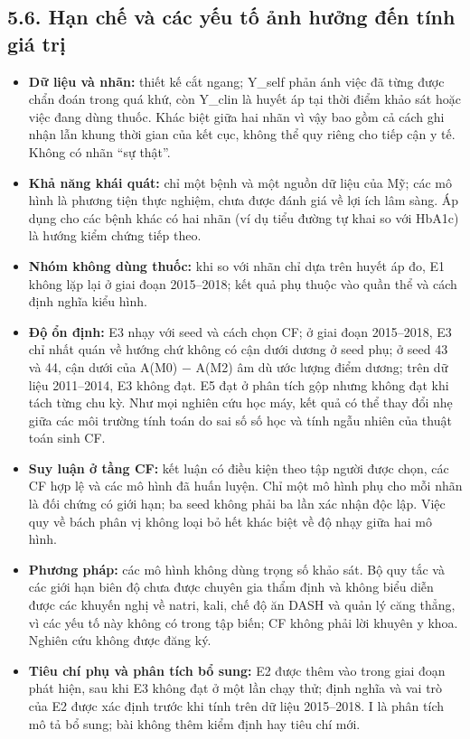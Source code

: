 \documentclass[9pt,a4paper]{extarticle}
\providecommand{\tightlist}{\setlength{\itemsep}{0pt}\setlength{\parskip}{0pt}}
\begin{document}
\subsection{5.6. Hạn chế và các yếu tố ảnh hưởng đến tính giá trị}

\begin{itemize}
\tightlist
\item
  \textbf{Dữ liệu và nhãn:} thiết kế cắt ngang; Y\_self phản ánh việc đã
  từng được chẩn đoán trong quá khứ, còn Y\_clin là huyết áp tại thời
  điểm khảo sát hoặc việc đang dùng thuốc. Khác biệt giữa hai nhãn vì
  vậy bao gồm cả cách ghi nhận lẫn khung thời gian của kết cục, không
  thể quy riêng cho tiếp cận y tế. Không có nhãn ``sự thật''.
\item
  \textbf{Khả năng khái quát:} chỉ một bệnh và một nguồn dữ liệu của Mỹ;
  các mô hình là phương tiện thực nghiệm, chưa được đánh giá về lợi ích
  lâm sàng. Áp dụng cho các bệnh khác có hai nhãn (ví dụ tiểu đường tự
  khai so với HbA1c) là hướng kiểm chứng tiếp theo.
\item
  \textbf{Nhóm không dùng thuốc:} khi so với nhãn chỉ dựa trên huyết áp
  đo, E1 không lặp lại ở giai đoạn 2015--2018; kết quả phụ thuộc vào
  quần thể và cách định nghĩa kiểu hình.
\item
  \textbf{Độ ổn định:} E3 nhạy với seed và cách chọn CF; ở giai đoạn
  2015--2018, E3 chỉ nhất quán về hướng chứ không có cận dưới dương ở
  seed phụ; ở seed 43 và 44, cận dưới của A(M0) − A(M2) âm dù ước lượng
  điểm dương; trên dữ liệu 2011--2014, E3 không đạt. E5 đạt ở phân tích
  gộp nhưng không đạt khi tách từng chu kỳ. Như mọi nghiên cứu học máy,
  kết quả có thể thay đổi nhẹ giữa các môi trường tính toán do sai số số
  học và tính ngẫu nhiên của thuật toán sinh CF.
\item
  \textbf{Suy luận ở tầng CF:} kết luận có điều kiện theo tập người được
  chọn, các CF hợp lệ và các mô hình đã huấn luyện. Chỉ một mô hình phụ
  cho mỗi nhãn là đối chứng có giới hạn; ba seed không phải ba lần xác
  nhận độc lập. Việc quy về bách phân vị không loại bỏ hết khác biệt về
  độ nhạy giữa hai mô hình.
\item
  \textbf{Phương pháp:} các mô hình không dùng trọng số khảo sát. Bộ quy
  tắc và các giới hạn biên độ chưa được chuyên gia thẩm định và không
  biểu diễn được các khuyến nghị về natri, kali, chế độ ăn DASH và quản
  lý căng thẳng, vì các yếu tố này không có trong tập biến; CF không
  phải lời khuyên y khoa. Nghiên cứu không được đăng ký.
\item
  \textbf{Tiêu chí phụ và phân tích bổ sung:} E2 được thêm vào trong
  giai đoạn phát hiện, sau khi E3 không đạt ở một lần chạy thử; định
  nghĩa và vai trò của E2 được xác định trước khi tính trên dữ liệu
  2015--2018. I là phân tích mô tả bổ sung; bài không thêm kiểm định hay
  tiêu chí mới.
\end{itemize}
\end{document}
